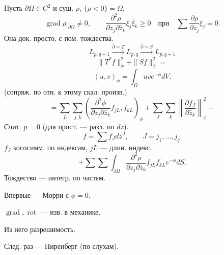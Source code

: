 \documentclass[11pt]{article}
\theoremstyle{definition}
\theoremstyle{remark}
\begin{document}
Пусть $\partial\Omega\in C^2$ и сущ. $\rho$, $\{\rho<0\}=\Omega$,
\begin{equation*}
\operatorname{grad}\rho|_{\partial\Omega}\ne0,
\qquad
\frac{\partial^2\rho}{\partial z_j\partial\bar z_k}\xi_j\bar\xi_k\ge0
\quad\text{при}\quad
\sum\frac{\partial\rho}{\partial z_j}\xi_j=0.
\end{equation*}
Она док. просто, с пом. тождества.
\begin{equation*}
L_{p,q-1}\overset{\bar\partial=T}{\longrightarrow}L_{p,q}
\overset{\bar\partial=S}{\longrightarrow}L_{p,q+1}
\end{equation*}
\begin{equation*}
\|T^*f\|_\phi^2+\|Sf\|_\phi^2=
\end{equation*}
\begin{equation*}
(u,v)_\phi=\int_\Omega u\bar v e^{-\phi}dV.
\end{equation*}
(сопряж. по отн. к этому скал. произв.)
\begin{equation*}
=\sum_L\sum_{j,k}\left(\frac{\partial^2\phi}{\partial z_j\partial\bar z_k}f_{jL},f_{kL}\right)_\phi
+\sum_J\sum_k\left\|\frac{\partial f_J}{\partial\bar z_k}\right\|_\phi^2+
\end{equation*}
Счит. $p=0$ (для прост. — разл. по $dz$).
\begin{equation*}
f=\sum f_Jd\bar z^J,\qquad J=j_1,\ldots,j_q.
\end{equation*}
$f_J$ кососимм. по индексам, $jL$ — длин. индекс.
\begin{equation*}
+\sum\sum\int_{\partial\Omega}\frac{\partial^2\rho}{\partial z_j\partial\bar z_k}f_{jL}\overline{f_{kL}}e^{-\phi}dS.
\end{equation*}
Тождество — интегр. по частям.

Впервые — Морри с $\phi=0$.

$\operatorname{grad},\operatorname{rot}$ — изв. в механике.

Из него разрешимость.

След. раз — Ниренберг (по слухам).
\end{document}
